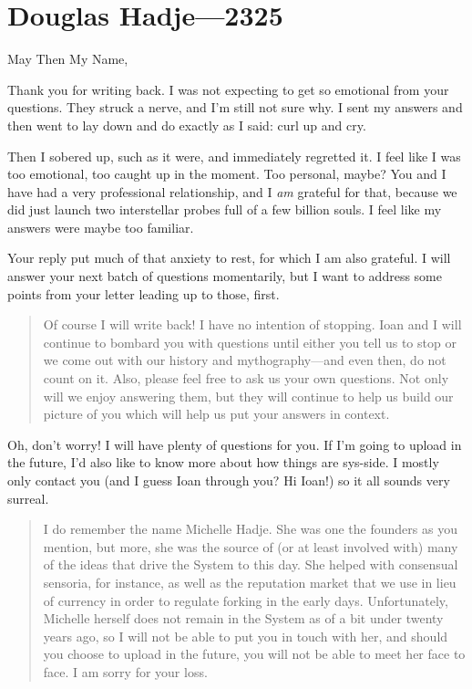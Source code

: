 \hypertarget{douglas-hadje-2325}{%
\chapter{Douglas Hadje—2325}\label{douglas-hadje-2325}}

May Then My Name,

Thank you for writing back. I was not expecting to get so emotional from your questions. They struck a nerve, and I'm still not sure why. I sent my answers and then went to lay down and do exactly as I said: curl up and cry.

Then I sobered up, such as it were, and immediately regretted it. I feel like I was too emotional, too caught up in the moment. Too personal, maybe? You and I have had a very professional relationship, and I \emph{am} grateful for that, because we did just launch two interstellar probes full of a few billion souls. I feel like my answers were maybe too familiar.

Your reply put much of that anxiety to rest, for which I am also grateful. I will answer your next batch of questions momentarily, but I want to address some points from your letter leading up to those, first.

\begin{quote}
Of course I will write back! I have no intention of stopping. Ioan and I will continue to bombard you with questions until either you tell us to stop or we come out with our history and mythography---and even then, do not count on it. Also, please feel free to ask us your own questions. Not only will we enjoy answering them, but they will continue to help us build our picture of you which will help us put your answers in context.
\end{quote}

\noindent Oh, don't worry! I will have plenty of questions for you. If I'm going to upload in the future, I'd also like to know more about how things are sys-side. I mostly only contact you (and I guess Ioan through you? Hi Ioan!) so it all sounds very surreal.

\begin{quote}
I do remember the name Michelle Hadje. She was one the founders as you mention, but more, she was the source of (or at least involved with) many of the ideas that drive the System to this day. She helped with consensual sensoria, for instance, as well as the reputation market that we use in lieu of currency in order to regulate forking in the early days. Unfortunately, Michelle herself does not remain in the System as of a bit under twenty years ago, so I will not be able to put you in touch with her, and should you choose to upload in the future, you will not be able to meet her face to face. I am sorry for your loss.
\end{quote}

